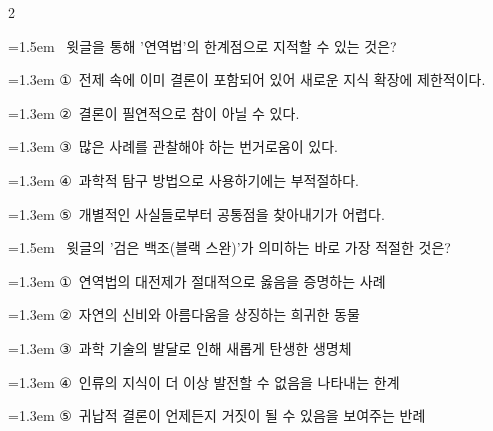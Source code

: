\documentclass[10pt, a4paper]{article}
\begin{document}
\begin{multicols}{2}
\noindent\begin{minipage}{\columnwidth}
\vspace{2mm}
{\hangindent=1.5em  ~윗글을 통해 '연역법'의 한계점으로 지적할 수 있는 것은?\par}

\vspace{0.5mm}
{\hangindent=1.3em  \noindent\hspace{0.3em}①~전제 속에 이미 결론이 포함되어 있어 새로운 지식 확장에 제한적이다.\par}
{\hangindent=1.3em  \noindent\hspace{0.3em}②~결론이 필연적으로 참이 아닐 수 있다.\par}
{\hangindent=1.3em  \noindent\hspace{0.3em}③~많은 사례를 관찰해야 하는 번거로움이 있다.\par}
{\hangindent=1.3em  \noindent\hspace{0.3em}④~과학적 탐구 방법으로 사용하기에는 부적절하다.\par}
{\hangindent=1.3em  \noindent\hspace{0.3em}⑤~개별적인 사실들로부터 공통점을 찾아내기가 어렵다.\par}
\vspace{4mm}
\end{minipage}
\par

\noindent\begin{minipage}{\columnwidth}
\vspace{2mm}
{\hangindent=1.5em  ~윗글의 '검은 백조(블랙 스완)'가 의미하는 바로 가장 적절한 것은?\par}

\vspace{0.5mm}
{\hangindent=1.3em  \noindent\hspace{0.3em}①~연역법의 대전제가 절대적으로 옳음을 증명하는 사례\par}
{\hangindent=1.3em  \noindent\hspace{0.3em}②~자연의 신비와 아름다움을 상징하는 희귀한 동물\par}
{\hangindent=1.3em  \noindent\hspace{0.3em}③~과학 기술의 발달로 인해 새롭게 탄생한 생명체\par}
{\hangindent=1.3em  \noindent\hspace{0.3em}④~인류의 지식이 더 이상 발전할 수 없음을 나타내는 한계\par}
{\hangindent=1.3em  \noindent\hspace{0.3em}⑤~귀납적 결론이 언제든지 거짓이 될 수 있음을 보여주는 반례\par}
\vspace{4mm}
\end{minipage}
\par


\end{multicols}
\end{document}
